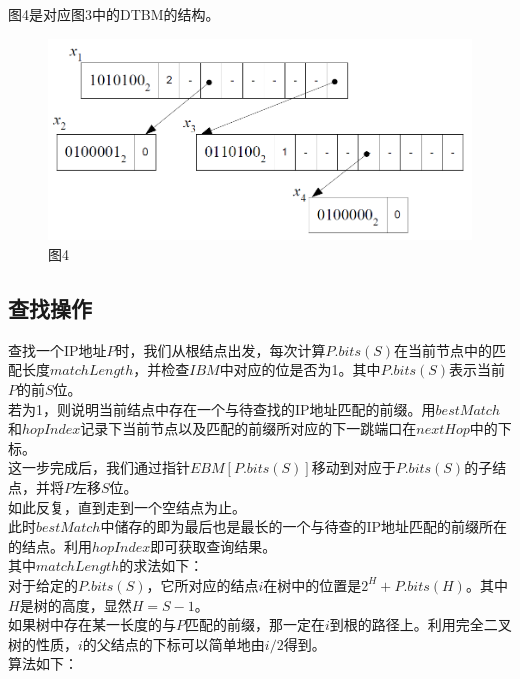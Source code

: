 \indent
图4是对应图3中的DTBM的结构。\\

\begin{figure}[h!]
\centering
\includegraphics[scale=0.6]{dtbm_struct.png}
\caption{图4}
\end{figure}

\subsection{查找操作}

查找一个IP地址$P$时，我们从根结点出发，每次计算$P.bits(S)$在当前节点中的匹配长度$matchLength$，并检查$IBM$中对应的位是否为1。其中$P.bits(S)$表示当前$P$的前$S$位。\\
\indent
若为1，则说明当前结点中存在一个与待查找的IP地址匹配的前缀。用$bestMatch$和$hopIndex$记录下当前节点以及匹配的前缀所对应的下一跳端口在$nextHop$中的下标。\\
\indent
这一步完成后，我们通过指针$EBM[P.bits(S)]$移动到对应于$P.bits(S)$的子结点，并将$P$左移$S$位。\\
\indent
如此反复，直到走到一个空结点为止。\\
\indent
此时$bestMatch$中储存的即为最后也是最长的一个与待查的IP地址匹配的前缀所在的结点。利用$hopIndex$即可获取查询结果。\\
\indent
其中$matchLength$的求法如下：\\
\indent
对于给定的$P.bits(S)$，它所对应的结点$i$在树中的位置是$2^{H} + P.bits(H)$。其中$H$是树的高度，显然$H = S - 1$。\\
\indent
如果树中存在某一长度的与$P$匹配的前缀，那一定在$i$到根的路径上。利用完全二叉树的性质，$i$的父结点的下标可以简单地由$i/2$得到。\\
\indent
算法如下：

\begin{algorithm}
\NoCaptionOfAlgo
\caption{$Lookup(P)$}
\end{algorithm}


